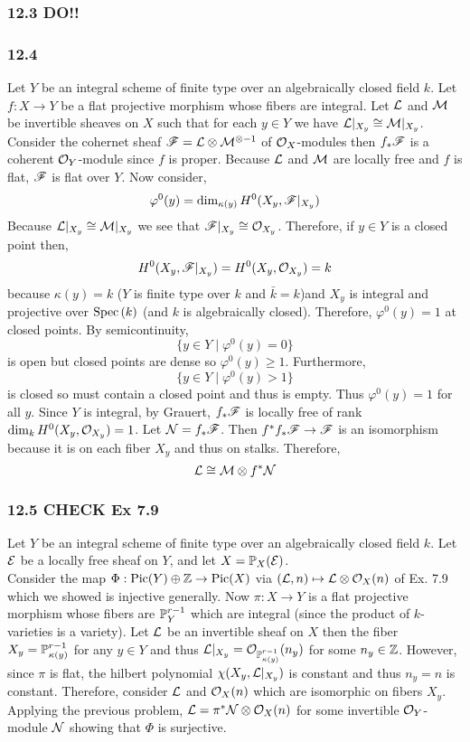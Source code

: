 \documentclass[12pt]{article}
\begin{document}
\subsubsection{12.3 DO!!}


\subsubsection{12.4}

Let $Y$ be an integral scheme of finite type over an algebraically closed field $k$. Let $f : X \to Y$ be a flat projective morphism whose fibers are integral. Let $\L$ and $\M$ be invertible sheaves on $X$ such that for each $y \in Y$ we have $\L|_{X_y} \cong \M|_{X_y}$. 
\bigskip\\
Consider the cohernet sheaf $\F = \L \otimes \M^{\otimes -1}$ of $\struct{X}$-modules then $f_* \F$ is a coherent $\struct{Y}$-module since $f$ is proper. Because $\L$ and $\M$ are locally free and $f$ is flat, $\F$ is flat over $Y$. Now consider,
\[ \varphi^0(y) = \dim_{\kappa(y)} H^0(X_y, \F|_{X_y}) \]
Because $\L|_{X_y} \cong \M|_{X_y}$ we see that $\F|_{X_y} \cong \struct{X_y}$. 
Therefore, if $y \in Y$ is a closed point then,
\[ H^0(X_y, \F|_{X_y}) = H^0(X_y, \struct{X_y}) = k \] because $\kappa(y) = k$ ($Y$ is finite type over $k$ and $\bar{k} = k$)and $X_y$ is integral and projective over $\Spec{k}$ (and $k$ is algebraically closed). Therefore, $\varphi^0(y) = 1$ at closed points. By semicontinuity, 
\[ \{ y \in Y \mid \varphi^0(y) = 0 \} \]
is open but closed points are dense so $\varphi^0(y) \ge 1$. Furthermore, 
\[ \{ y \in Y \mid \varphi^0(y) > 1 \} \]
is closed so must contain a closed point and thus is empty. Thus $\varphi^0(y) = 1$ for all $y$. Since $Y$ is integral, by Grauert, $f_* \F$ is locally free of rank $\dim_k H^0(X_y, \struct{X_y}) = 1$. Let $\sN = f_* \F$. Then $f^* f_* \F \to \F$ is an isomorphism because it is on each fiber $X_y$ and thus on stalks. Therefore,
\[ \L \cong \M \otimes f^* \sN \]

\subsubsection{12.5 CHECK Ex 7.9}

Let $Y$ be an integral scheme of finite type over an algebraically closed field $k$. Let $\E$ be a locally free sheaf on $Y$, and let $X = \P_X(\E)$. 
\bigskip\\
Consider the map $\Phi : \Pic{Y} \oplus \Z \to \Pic{X}$ via $(\L, n) \mapsto \L \otimes \struct{X}(n)$ of Ex. 7.9 which we showed is injective generally.
\bigskip
Now $\pi : X \to Y$ is a flat projective morphism whose fibers are $\P^{r-1}_Y$ which are integral (since the product of $k$-varieties is a variety). Let $\L$ be an invertible sheaf on $X$ then the fiber $X_y = \P^{r-1}_{\kappa(y)}$ for any $y \in Y$ and thus $\L|_{X_y} = \struct{\P^{r-1}_{\kappa(y)}}(n_y)$ for some $n_y \in \Z$. However, since $\pi$ is flat, the hilbert polynomial $\chi(X_y, \L|_{X_y})$ is constant and thus $n_y = n$ is constant. Therefore, consider $\L$ and $\struct{X}(n)$ which are isomorphic on fibers $X_y$. Applying the previous problem, $\L = \pi^* \sN \otimes \struct{X}(n)$ for some invertible $\struct{Y}$-module $\sN$ showing that $\Phi$ is surjective.
\end{document}
